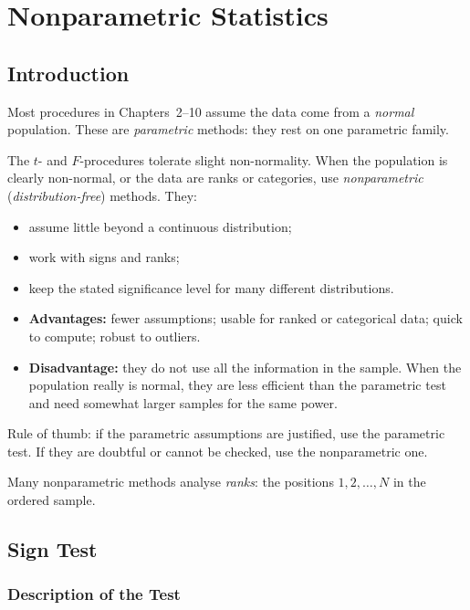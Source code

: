 \chapter{Nonparametric Statistics}

\section{Introduction}

Most procedures in Chapters~2--10 assume the data come from a \emph{normal} population. These are \emph{parametric} methods: they rest on one parametric family.

The $t$- and $F$-procedures tolerate slight non-normality. When the population is clearly non-normal, or the data are ranks or categories, use \emph{nonparametric} (\emph{distribution-free}) methods. They:
\begin{itemize}
  \item assume little beyond a continuous distribution;
  \item work with signs and ranks;
  \item keep the stated significance level for many different distributions.
\end{itemize}

\begin{itemize}
  \item \textbf{Advantages:} fewer assumptions; usable for ranked or categorical data; quick to compute; robust to outliers.
  \item \textbf{Disadvantage:} they do not use all the information in the sample. When the population really is normal, they are less efficient than the parametric test and need somewhat larger samples for the same power.
\end{itemize}
Rule of thumb: if the parametric assumptions are justified, use the parametric test. If they are doubtful or cannot be checked, use the nonparametric one.

Many nonparametric methods analyse \emph{ranks}: the positions $1,2,\dots,N$ in the ordered sample.

\section{Sign Test}

\subsection{Description of the Test}

